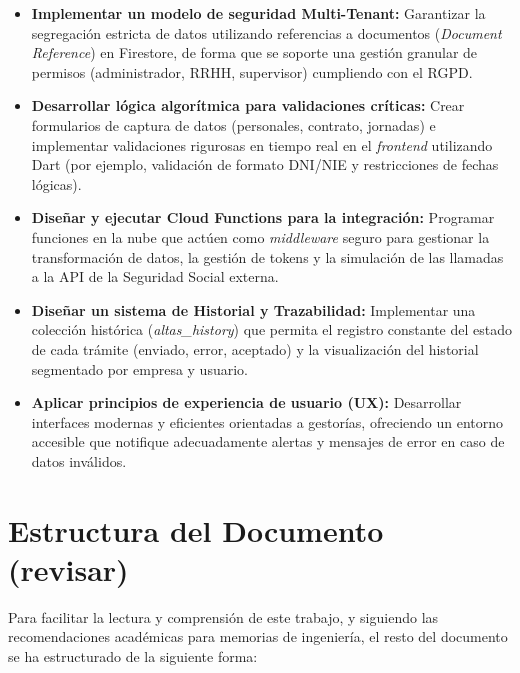 \begin{itemize}

    \item[•] \textbf{Implementar un modelo de seguridad Multi-Tenant:} Garantizar la segregación estricta de datos utilizando referencias a documentos (\textit{Document Reference}) en Firestore, de forma que se soporte una gestión granular de permisos (administrador, RRHH, supervisor) cumpliendo con el RGPD.

    \item[•] \textbf{Desarrollar lógica algorítmica para validaciones críticas:} Crear formularios de captura de datos (personales, contrato, jornadas) e implementar validaciones rigurosas en tiempo real en el \textit{frontend} utilizando Dart (por ejemplo, validación de formato DNI/NIE y restricciones de fechas lógicas).

    \item[•] \textbf{Diseñar y ejecutar Cloud Functions para la integración:} Programar funciones en la nube que actúen como \textit{middleware} seguro para gestionar la transformación de datos, la gestión de tokens y la simulación de las llamadas a la API de la Seguridad Social externa.

    \item[•] \textbf{Diseñar un sistema de Historial y Trazabilidad:} Implementar una colección histórica (\textit{altas\_history}) que permita el registro constante del estado de cada trámite (enviado, error, aceptado) y la visualización del historial segmentado por empresa y usuario.

    \item[•] \textbf{Aplicar principios de experiencia de usuario (UX):} Desarrollar interfaces modernas y eficientes orientadas a gestorías, ofreciendo un entorno accesible que notifique adecuadamente alertas y mensajes de error en caso de datos inválidos.

\end{itemize}


\section{Estructura del Documento (revisar)} \label{sct:intro_estructura}

Para facilitar la lectura y comprensión de este trabajo, y siguiendo las recomendaciones académicas para memorias de ingeniería, el resto del documento se ha estructurado de la siguiente forma:

